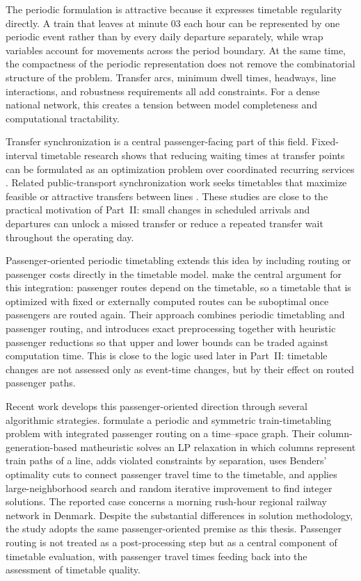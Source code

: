 \documentclass[preprint,12pt]{elsarticle}
\begin{document}
The periodic formulation is attractive because it expresses timetable regularity directly. A train that leaves at minute 03 each hour can be represented by one periodic event rather than by every daily departure separately, while wrap variables account for movements across the period boundary. At the same time, the compactness of the periodic representation does not remove the combinatorial structure of the problem. Transfer arcs, minimum dwell times, headways, line interactions, and robustness requirements all add constraints. For a dense national network, this creates a tension between model completeness and computational tractability.

Transfer synchronization is a central passenger-facing part of this field. Fixed-interval timetable research shows that reducing waiting times at transfer points can be formulated as an optimization problem over coordinated recurring services \citep{nachtigallVoget1997FixedInterval}. Related public-transport synchronization work seeks timetables that maximize feasible or attractive transfers between lines \citep{cederGolanyTal2001Synchronization}. These studies are close to the practical motivation of Part~II: small changes in scheduled arrivals and departures can unlock a missed transfer or reduce a repeated transfer wait throughout the operating day.

Passenger-oriented periodic timetabling extends this idea by including routing or passenger costs directly in the timetable model. \citet{schiewe2020integrated} make the central argument for this integration: passenger routes depend on the timetable, so a timetable that is optimized with fixed or externally computed routes can be suboptimal once passengers are routed again. Their approach combines periodic timetabling and passenger routing, and introduces exact preprocessing together with heuristic passenger reductions so that upper and lower bounds can be traded against computation time. This is close to the logic used later in Part~II: timetable changes are not assessed only as event-time changes, but by their effect on routed passenger paths.

Recent work develops this passenger-oriented direction through several algorithmic strategies. \citet{martinIradiRopke2022Matheuristic} formulate a periodic and symmetric train-timetabling problem with integrated passenger routing on a time--space graph. Their column-generation-based matheuristic solves an LP relaxation in which columns represent train paths of a line, adds violated constraints by separation, uses Benders' optimality cuts to connect passenger travel time to the timetable, and applies large-neighborhood search and random iterative improvement to find integer solutions. The reported case concerns a morning rush-hour regional railway network in Denmark. Despite the substantial differences in solution methodology, the study adopts the same passenger-oriented premise as this thesis. Passenger routing is not treated as a post-processing step but as a central component of timetable evaluation, with passenger travel times feeding back into the assessment of timetable quality.
\end{document}
